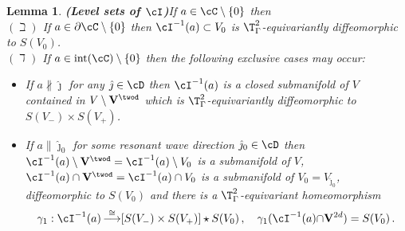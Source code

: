 \documentclass[11pt,a4paper,reqno]{article}
\DeclareMathOperator{\interior}{int}
\DeclareMathOperator*{\toup}{\longrightarrow}
\numberwithin{equation}{section}
\newtheorem{lemma}[theorem]{Lemma}
\theoremstyle{definition}
\begin{document}
    
        \begin{lemma}{\bf (Level sets of $\cI$)}\label{prop:levelsets of cI}
           If  $a\in \cC \setminus \{0\} $ then 
    \\[1mm]     
        $(\beth)$
               If $a\in \partial \cC\setminus\{0\}$ then  $\cI^{-1}(a) \subset V_0 $ is $\T^2_\Gamma$-equivariantly diffeomorphic to $S(V_0)$.
               \\[1mm]
  $(\daleth)$
                If $a\in \interior(\cC)\setminus\{0\}  $ then the following exclusive cases may occur:
                \begin{itemize}
                    \item[$(\daleth$1)] 
                     If $a\not \parallel \hat \jmath$ for any $\hat \jmath\in \cD$ then  $\cI^{-1}(a)$ is a closed submanifold of $V$  contained in $V\setminus 
                    {\bf V}^{\twod} $ which is 
                    $\T^2_\Gamma$-equivariantly diffeomorphic to $S(V_-)\times S(V_+) $.
                    
                    \item[$(\daleth$2)] 
                     If $a\parallel \hat \jmath_0$ for some resonant wave direction $\hat \jmath_0\in \cD$
                    then  
 $       \cI^{-1}(a)\setminus {\bf V}^{\twod}  = 
                     \cI^{-1}(a)\setminus  V_0  $
is a submanifold of $  V $, 
       $  \cI^{-1}(a)\cap {\bf V}^{\twod}  = \cI^{-1}(a)\cap V_0 $ is a submanifold of  $ V_0 = V_{\hat \jmath_0} $, diffeomorphic to 
       $ S(V_0) $ 
                      and there is a $\T^2_\Gamma$-equivariant homeomorphism 
                    \begin{equation}\label{gamma homeomorphism_2}
                        \gamma_1:\cI^{-1}(a)\toup^{\cong}[S(V_-)\times S(V_+)] \star S(V_0)\, ,
                        \quad \gamma_1(\cI^{-1}(a) {\cap {\bf V}^{2d}})=S(V_0) \, .
                    \end{equation}
                \end{itemize}
        \end{lemma}    
\end{document}
